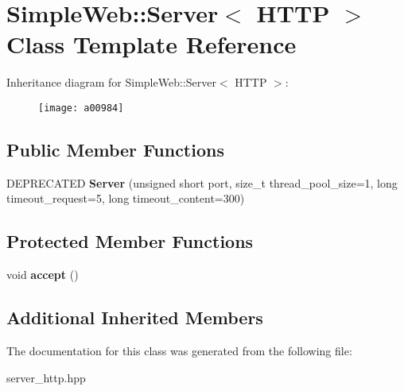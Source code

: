\hypertarget{a00984}{}\section{Simple\+Web\+:\+:Server$<$ H\+T\+TP $>$ Class Template Reference}
\label{a00984}
Inheritance diagram for Simple\+Web\+:\+:Server$<$ H\+T\+TP $>$\+:\begin{figure}[H]
\begin{center}
\leavevmode
\texttt{[image: a00984]}
\end{center}
\end{figure}
\subsection*{Public Member Functions}
\begin{DoxyCompactItemize}
\item 
\mbox{\label{a00984_a926e5ebedafc2d17a944698197b7f002}} 
D\+E\+P\+R\+E\+C\+A\+T\+ED {\bfseries Server} (unsigned short port, size\+\_\+t thread\+\_\+pool\+\_\+size=1, long timeout\+\_\+request=5, long timeout\+\_\+content=300)
\end{DoxyCompactItemize}
\subsection*{Protected Member Functions}
\begin{DoxyCompactItemize}
\item 
\mbox{\label{a00984_abe9f9de361dcb01541e0302eac21986d}} 
void {\bfseries accept} ()
\end{DoxyCompactItemize}
\subsection*{Additional Inherited Members}


The documentation for this class was generated from the following file\+:\begin{DoxyCompactItemize}
\item 
server\+\_\+http.\+hpp\end{DoxyCompactItemize}
